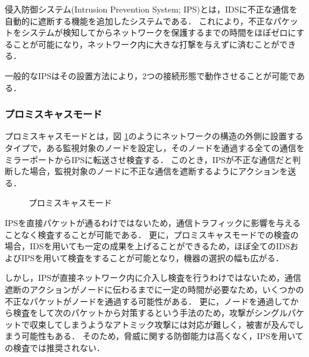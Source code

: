 侵入防御システム(Intrusion Prevention System; IPS)とは，IDSに不正な通信を自動的に遮断する機能を追加したシステムである．
これにより，不正なパケットをシステムが検知してからネットワークを保護するまでの時間をほぼゼロにすることが可能になり，ネットワーク内に大きな打撃を与えずに済むことができる．

一般的なIPSはその設置方法により，2つの接続形態で動作させることが可能である．

\subsubsection{プロミスキャスモード}

プロミスキャスモードとは，図 \ref{fig:2-1}のようにネットワークの構造の外側に設置するタイプで，ある監視対象のノードを設定し，そのノードを通過する全ての通信をミラーポートからIPSに転送させ検査する\cite{ciscoips}．
このとき，IPSが不正な通信だと判断した場合，監視対象のノードに不正な通信を遮断するようにアクションを送る．

\begin{figure}[tb]
	\begin{center}
		\caption{プロミスキャスモード}
		\label{fig:2-1}
	\end{center}
\end{figure}

IPSを直接パケットが通るわけではないため，通信トラフィックに影響を与えることなく検査することが可能である．
更に，プロミスキャスモードでの検査の場合，IDSを用いても一定の成果を上げることができるため，ほぼ全てのIDSおよびIPSを用いて検査をすることが可能となり，機器の選択の幅も広がる．

しかし，IPSが直接ネットワーク内に介入し検査を行うわけではないため，通信遮断のアクションがノードに伝わるまでに一定の時間が必要なため，いくつかの不正なパケットがノードを通過する可能性がある．
更に，ノードを通過してから検査をして次のパケットから対策するという手法のため，攻撃がシングルパケットで収束してしまうようなアトミック攻撃には対応が難しく，被害が及んでしまう可能性もある．
そのため，脅威に関する防御能力は高くなく，IPSを用いての検査では推奨されない．

